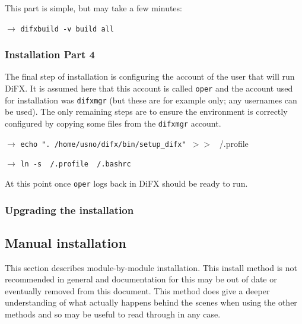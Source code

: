 This part is simple, but may take a few minutes:

$\longrightarrow$ {\tt difxbuild -v build all}

\subsubsection{Installation Part 4}

The final step of installation is configuring the account of the user that will run DiFX.
It is assumed here that this account is called {\tt oper} and the account used for installation was {\tt difxmgr} (but these are for example only; any usernames can be used).
The only remaining steps are to ensure the environment is correctly configured by copying some files from the {\tt difxmgr} account.

$\longrightarrow$ {\tt echo ". /home/usno/difx/bin/setup\_difx" }$>>${ ~/.profile}

$\longrightarrow$ {\tt ln -s ~/.profile ~/.bashrc}

At this point once {\tt oper} logs back in DiFX should be ready to run.

\subsubsection{Upgrading the installation}





\subsection{Manual installation}

This section describes module-by-module installation.
This install method is not recommended in general and documentation for this may be out of date or eventually removed from this document.
This method does give a deeper understanding of what actually happens behind the scenes when using the other methods and so may be useful to read through in any case.

